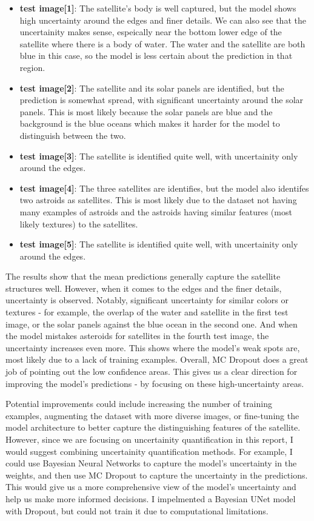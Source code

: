 \documentclass{article}
\begin{document}
\begin{itemize}
    \item \textbf{test image[1]}: The satellite's body is well captured, but the model shows high uncertainty around the 
    edges and finer details. We can also see that the uncertainity makes sense, espeically near the bottom lower edge of 
    the satellite where there is a body of water. The water and the satellite are both blue in this case, so the model is 
    less certain about the prediction in that region.
    \item \textbf{test image[2]}: The satellite and its solar panels are identified, but the prediction is somewhat 
    spread, with significant uncertainty around the solar panels. This is most likely because the solar panels are blue 
    and the background is the blue oceans which makes it harder for the model to distinguish between the two.
    \item \textbf{test image[3]}: The satellite is identified quite well, with uncertainity only around the edges.
    \item \textbf{test image[4]}: The three satellites are identifies, but the model also identifes two astroids as satellites. 
    This is most likely due to the dataset not having many examples of astroids and the astroids having similar features 
    (most likely textures) to the satellites.
    \item \textbf{test image[5]}: The satellite is identified quite well, with uncertainity only around the edges.
\end{itemize}
\vspace{1em}

The results show that the mean predictions generally capture the satellite structures well. However, when it comes to the 
edges and the finer details, uncertainty is observed. Notably, significant uncertainty for similar colors or textures - 
for example, the overlap of the water and satellite in the first test image, or the solar panels against the blue ocean in the 
second one. And when the model mistakes asteroids for satellites in the fourth test image, the uncertainty increases 
even more. This shows where the model's weak spots are, most likely due to a lack of training examples. Overall, MC Dropout 
does a great job of pointing out the low confidence areas. This gives us a clear direction for improving the model's  
predictions - by focusing on these high-uncertainty areas.
\vspace{1em}

Potential improvements could include increasing the number of training examples, augmenting the dataset with more diverse
images, or fine-tuning the model architecture to better capture the distinguishing features of the satellite. However, 
since we are focusing on uncertainity quantification in this report, I would suggest combining uncertainity quantification
methods. For example, I could use Bayesian Neural Networks to capture the model's uncertainty in the weights, and then
use MC Dropout to capture the uncertainty in the predictions. This would give us a more comprehensive view of the model's
uncertainty and help us make more informed decisions.  I impelmented a Bayesian UNet model with Dropout, but could not 
train it due to computational limitations.
\end{document}
